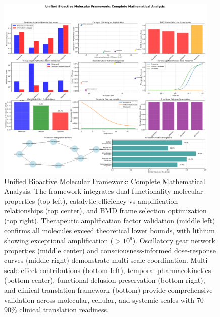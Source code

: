 \begin{figure}[htbp]
\centering
\includegraphics[width=0.95\textwidth]{images/unified_bioactive_framework_20251004_100644.png}
\caption{Unified Bioactive Molecular Framework: Complete Mathematical Analysis. The framework integrates dual-functionality molecular properties (top left), catalytic efficiency vs amplification relationships (top center), and BMD frame selection optimization (top right). Therapeutic amplification factor validation (middle left) confirms all molecules exceed theoretical lower bounds, with lithium showing exceptional amplification ($>10^{9}$). Oscillatory gear network properties (middle center) and consciousness-informed dose-response curves (middle right) demonstrate multi-scale coordination. Multi-scale effect contributions (bottom left), temporal pharmacokinetics (bottom center), functional delusion preservation (bottom right), and clinical translation framework (bottom) provide comprehensive validation across molecular, cellular, and systemic scales with 70-90\% clinical translation readiness.}
\label{fig:unified_framework}
\end{figure}
